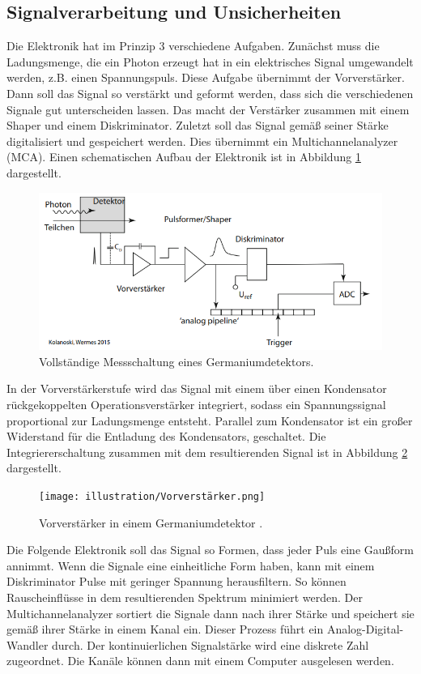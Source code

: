 \subsection{Signalverarbeitung und Unsicherheiten}
Die Elektronik hat im Prinzip 3 verschiedene Aufgaben. Zunächst muss die Ladungsmenge, die ein Photon erzeugt hat in ein elektrisches Signal umgewandelt werden, z.B. einen Spannungspuls.
Diese Aufgabe übernimmt der Vorverstärker. Dann soll das Signal so verstärkt und geformt werden, dass sich die verschiedenen Signale gut unterscheiden lassen. Das macht der Verstärker 
zusammen mit einem Shaper und einem Diskriminator. Zuletzt soll das Signal gemäß seiner Stärke digitalisiert und gespeichert werden. Dies übernimmt ein Multichannelanalyzer (MCA).
Einen schematischen Aufbau der Elektronik ist in Abbildung \ref{fig:Schaltung} dargestellt.
\begin{figure}
    \centering
    \includegraphics[scale=0.8]{illustration/Messchaltung.png}
    \caption{Vollständige Messschaltung eines Germaniumdetektors\cite{Detektor}.}
    \label{fig:Schaltung}
\end{figure}
\noindent In der Vorverstärkerstufe wird das Signal mit einem über einen Kondensator rückgekoppelten Operationsverstärker integriert, sodass ein Spannungssignal proportional zur Ladungsmenge entsteht.
Parallel zum Kondensator ist ein großer Widerstand für die Entladung des Kondensators, geschaltet. Die Integriererschaltung zusammen mit dem resultierenden Signal ist in Abbildung \ref{fig:PreAmp} dargestellt.
\begin{figure}[H]
    \centering
    \texttt{[image: illustration/Vorverstärker.png]}
    \caption{Vorverstärker in einem Germaniumdetektor \cite{Detektor}.}
    \label{fig:PreAmp}
\end{figure}
\noindent Die Folgende Elektronik soll das Signal so Formen, dass jeder Puls eine Gaußform annimmt. Wenn die Signale eine einheitliche Form haben, kann mit einem Diskriminator
Pulse mit geringer Spannung herausfiltern. So können Rauscheinflüsse in dem resultierenden Spektrum minimiert werden. 
Der Multichannelanalyzer sortiert die Signale dann nach ihrer Stärke und speichert sie gemäß ihrer Stärke in einem Kanal ein. Dieser Prozess führt ein Analog-Digital-Wandler durch.
Der kontinuierlichen Signalstärke wird eine diskrete Zahl zugeordnet. 
Die Kanäle können dann mit einem Computer ausgelesen werden.


